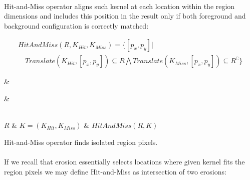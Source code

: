 \paragraph*{}
Hit-and-Miss operator aligns such kernel at each location within the region dimensions and includes this position in the result only if both foreground and background configuration is correctly matched:

\[
\begin{array}{l}
HitAndMiss(R,K_{Hit},K_{Miss}) =  \{ [p_x,p_y] | \\
\quad Translate(K_{Hit}, [p_x,p_y]) \subseteq R \bigwedge 
 Translate(K_{Miss}, [p_x,p_y]) \subseteq R^{\complement} \} 

\end{array}
\]


\newarray\hitAndMissInput
{}

\newarray\hitAndMissKernel
{}

\newarray\hitAndMissResult
{}

\begin{table}[h]
\centering
{}

 &
 &

\\

$R$ &
$K = (K_{Hit}, K_{Miss})$ &
$HitAndMiss(R, K)$

\endtabular
\caption{Hit-and-Miss operator finds isolated region pixels.}
\label{tab:HitAndMiss}
\end{table}

\paragraph*{}
If we recall that erosion essentially selects locations where given kernel fits the region pixels we may define Hit-and-Miss as intersection of two erosions:

